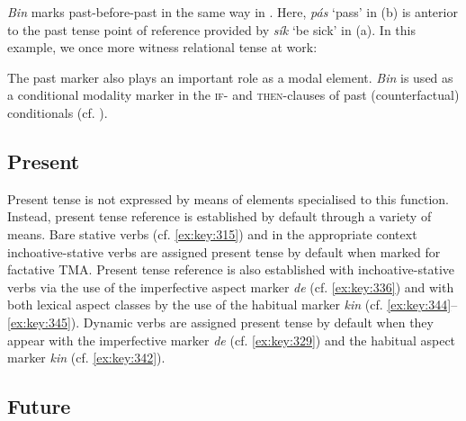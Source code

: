 \textit{Bin} marks past-before-past in the same way in . Here, \textit{pás} ‘pass’ in (b) is anterior to the past tense point of reference provided by \textit{sík} ‘be sick’ in (a). In this example, we once more witness relational tense at work:


\ea%
    \label{ex:key:385}
\z
\z

The past marker also plays an important role as a modal element. \textit{Bin} is used as a conditional modality marker in the \textsc{if-} and \textsc{then-}clauses of past (counterfactual) conditionals (cf. ).

\subsection{Present}\label{sec:6.5.3}

Present tense is not expressed by means of elements specialised to this function. Instead, present tense reference is established by default through a variety of means. Bare stative verbs (cf. \ref{ex:key:315}) and in the appropriate context inchoative-stative verbs  are assigned present tense by default when marked for factative TMA. Present tense reference is also established with inchoative-stative verbs via the use of the imperfective aspect marker \textit{de} (cf. \ref{ex:key:336}) and with both lexical aspect classes by the use of the habitual marker \textit{kin} (cf. \ref{ex:key:344}–\ref{ex:key:345}). Dynamic verbs are assigned present tense by default when they appear with the imperfective marker \textit{de} (cf. \ref{ex:key:329}) and the habitual aspect marker \textit{kin} (cf. \ref{ex:key:342}). 

\subsection{Future}\label{sec:6.5.4}

